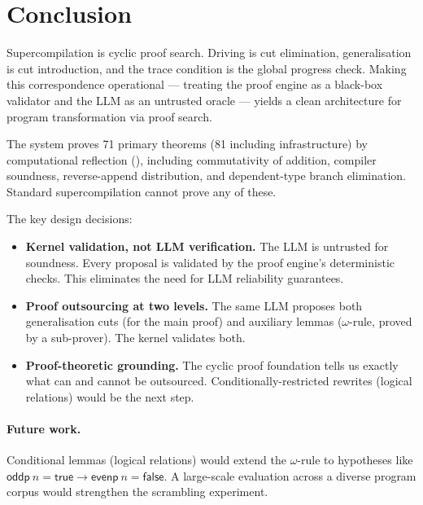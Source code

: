 \section{Conclusion}
\label{sec:conclusion}

Supercompilation is cyclic proof search.  Driving is cut elimination,
generalisation is cut introduction, and the trace condition is the global
progress check.  Making this correspondence operational --- treating the
proof engine as a black-box validator and the LLM as an untrusted oracle
--- yields a clean architecture for program transformation via proof search.

The system proves 71 primary theorems (81 including infrastructure) by
computational reflection (\vmcompute), including commutativity of addition,
compiler soundness, reverse-append distribution, and dependent-type branch
elimination.  Standard supercompilation cannot prove any of these.

The key design decisions:
\begin{itemize}[leftmargin=*]
\item \textbf{Kernel validation, not LLM verification.} The LLM is untrusted
  for soundness.  Every proposal is validated by the proof engine's
  deterministic checks.  This eliminates the need for LLM reliability
  guarantees.
\item \textbf{Proof outsourcing at two levels.} The same LLM proposes both
  generalisation cuts (for the main proof) and auxiliary lemmas
  ($\omega$-rule, proved by a sub-prover).  The kernel validates both.
\item \textbf{Proof-theoretic grounding.} The cyclic proof foundation tells
  us exactly what can and cannot be outsourced.  Conditionally-restricted
  rewrites (logical relations) would be the next step.
\end{itemize}

\paragraph{Future work.}
Conditional lemmas (logical relations) would extend the $\omega$-rule to
hypotheses like $\mathsf{oddp}\ n = \mathsf{true} \to \mathsf{evenp}\ n =
\mathsf{false}$.  A large-scale evaluation across a diverse program corpus
would strengthen the scrambling experiment.
